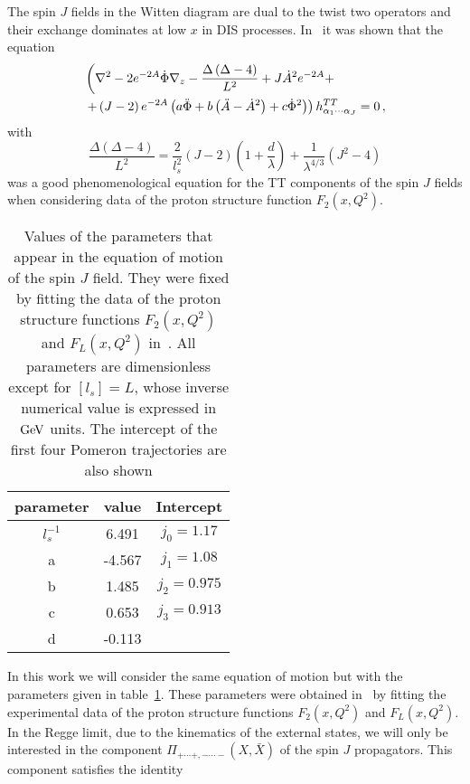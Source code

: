 \documentclass[preprint, 12pt]{elsarticle}
\begin{document}
The spin $J$ fields in the Witten diagram are dual to the twist two operators and their exchange dominates at low $x$ in DIS processes. In~\cite{ballon_bayona_unity_2017}  it was shown that the equation
\begin{align}
&\left( \nabla^2 - 2 e^{-2A} \dot{\Phi} \nabla_z - \frac{\Delta\left(\Delta - 4\right)}{L^2} + J \dot{A}^2 e^{-2A} + \right. \notag \\
&\left. + \left(J-2\right) e^{-2A} \left( a \ddot{\Phi} + b \left(\ddot{A}-\dot{A}^2\right) + c \dot{\Phi}^2 \right)\right) h^{TT}_{\alpha_1 \cdots \alpha_J} = 0 \, ,
\end{align}
with
\begin{equation}
\frac{\Delta\left(\Delta - 4\right)}{L^2}  = \frac{2}{l_s^2} \left( J - 2 \right) \left( 1+ \frac{d}{\lambda} \right) + \frac{1}{\lambda^{4/3}} \left(J^2 - 4 \right)
\end{equation}
was a good phenomenological equation for the TT components of the spin $J$ fields when considering data of the proton structure function $F_2\left(x, Q^2\right)$. 
\begin{table}[t!]
 \centering
  \caption{Values of the parameters that appear in the equation of motion of the spin $J$ field. They were fixed by fitting the data of the proton structure functions $F_2\left(x,Q^2\right)$ and $F_L\left(x, Q^2\right)$ in~\cite{gluonPDF_IHQCD_2020}. All parameters are dimensionless except for $[l_s]=L$, whose inverse numerical value is expressed in ${\rm GeV}$ units. The intercept of the first four Pomeron trajectories are also shown}
\label{table:pomeron_kernel_parameters}
\vspace{0.5cm}
  \begin{tabular}{|c|c|c|}
  \hline
  parameter & value  & Intercept  \\ \hline
  $l_s^{-1}$  & 6.491 & $j_0 = 1.17$   \\ \hline
  a           & -4.567  & $j_1 =1.08$   \\ \hline
  b           & 1.485  & $j_2 =0.975$     \\ \hline
  c           & 0.653  & $j_3 =0.913$    \\ \hline
  d           & -0.113 &  \\ \hline
  \end{tabular}
  \end{table}
In this work we will consider the same equation of motion but with the parameters given in table~\ref{table:pomeron_kernel_parameters}. These parameters were obtained in~\cite{gluonPDF_IHQCD_2020} by fitting the experimental data of the proton structure functions $F_2\left(x,Q^2\right)$ and $F_L\left(x, Q^2\right)$. In the Regge limit, due to the kinematics of the external states, we will only be interested in the component $\Pi_{+\cdots+,-\cdots -}\left(X, \bar{X}\right)$ of the spin $J$ propagators. This component satisfies the identity
\end{document}
